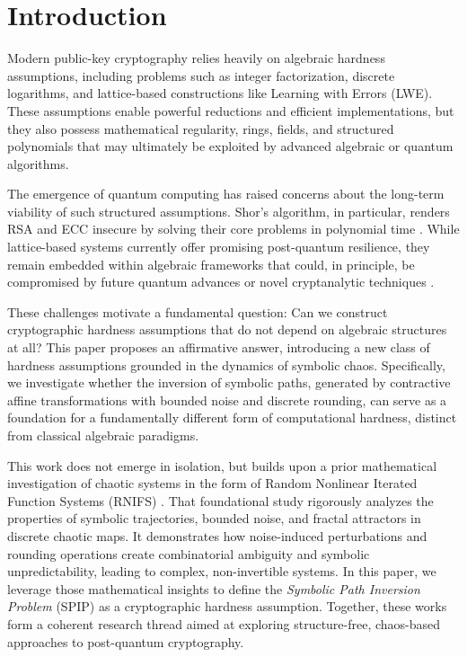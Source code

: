 \documentclass[twocolumn,10pt]{article}
\begin{document}
\section{Introduction} \label{sec:intro}
\vspace{0.8em}

Modern public-key cryptography relies heavily on algebraic hardness assumptions, including problems such as integer factorization, discrete logarithms, and lattice-based constructions like Learning with Errors (LWE). These assumptions enable powerful reductions and efficient implementations, but they also possess mathematical regularity, rings, fields, and structured polynomials that may ultimately be exploited by advanced algebraic or quantum algorithms.

The emergence of quantum computing has raised concerns about the long-term viability of such structured assumptions. Shor’s algorithm, in particular, renders RSA and ECC insecure by solving their core problems in polynomial time \cite{shor1994algorithms}. While lattice-based systems currently offer promising post-quantum resilience, they remain embedded within algebraic frameworks that could, in principle, be compromised by future quantum advances or novel cryptanalytic techniques \cite{hecht2021pqc,alagic2024status,aharonov2005lattice}.

These challenges motivate a fundamental question: Can we construct cryptographic hardness assumptions that do not depend on algebraic structures at all? This paper proposes an affirmative answer, introducing a new class of hardness assumptions grounded in the dynamics of symbolic chaos. Specifically, we investigate whether the inversion of symbolic paths, generated by contractive affine transformations with bounded noise and discrete rounding, can serve as a foundation for a fundamentally different form of computational hardness, distinct from classical algebraic paradigms.

This work does not emerge in isolation, but builds upon a prior mathematical investigation of chaotic systems in the form of Random Nonlinear Iterated Function Systems (RNIFS) \cite{bouke2025rnifs}. That foundational study rigorously analyzes the properties of symbolic trajectories, bounded noise, and fractal attractors in discrete chaotic maps. It demonstrates how noise-induced perturbations and rounding operations create combinatorial ambiguity and symbolic unpredictability, leading to complex, non-invertible systems. In this paper, we leverage those mathematical insights to define the \textit{Symbolic Path Inversion Problem} (SPIP) as a cryptographic hardness assumption. Together, these works form a coherent research thread aimed at exploring structure-free, chaos-based approaches to post-quantum cryptography.
\end{document}
